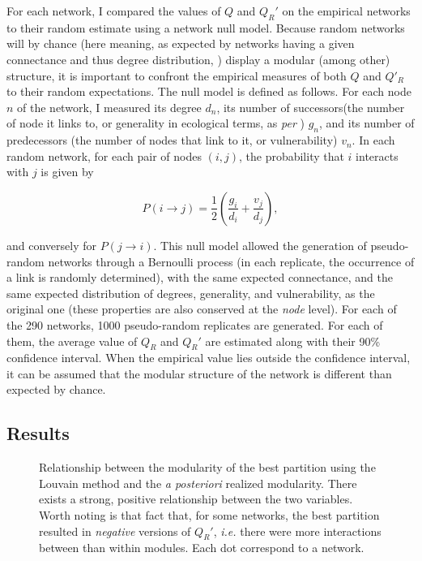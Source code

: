 \documentclass[12pt,oneside]{article}
\begin{document}
For each network, I compared the values of $Q$ and $Q_R'$ on the empirical
networks to their random estimate using a network null model. Because random
networks will by chance (here meaning, as expected by networks having a
given connectance and thus degree distribution, \textcite{poisot_when_2013})
display a modular (among other) structure, it is important to confront the
empirical measures of both $Q$ and $Q'_R$ to their random expectations. The
null model is defined as follows. For each node $n$ of the network, I measured
its degree $d_n$, its number of successors(the number of node it links to,
or generality in ecological terms, as \emph{per} \cite{schoener_food_1989})
$g_n$, and its number of predecessors (the number of nodes that link to it,
or vulnerability) $v_n$. In each random network, for each pair of nodes
$(i,j)$, the probability that $i$ interacts with $j$ is given by

\begin{equation}
P(i\rightarrow j) = \frac{1}{2}\left(\frac{g_i}{d_i}+\frac{v_j}{d_j}\right),
\label{e:null}
\end{equation}

\noindent and conversely for $P(j \rightarrow i)$. This null model allowed
the generation of pseudo-random networks through a Bernoulli process (in
each replicate, the occurrence of a link is randomly determined), with the
same expected connectance, and the same expected distribution of degrees,
generality, and vulnerability, as the original one (these properties are
also conserved at the \emph{node} level).  For each of the 290 networks,
1000 pseudo-random replicates are generated. For each of them, the average
value of $Q_R$ and $Q_R'$ are estimated along with their 90\% confidence
interval. When the empirical value lies outside the confidence interval,
it can be assumed that the modular structure of the network is different
than expected by chance.

\subsection{Results}

\begin{figure}[tbp]
\begin{center}
\end{center}
\caption{Relationship between the modularity of the best partition using the Louvain method and the \emph{a posteriori} realized modularity. There exists a strong, positive relationship between the two variables. Worth noting is that fact that, for some networks, the best partition resulted in \emph{negative} versions of $Q_R'$, \emph{i.e.} there were more interactions between than within modules. Each dot correspond to a network.}
\label{f:qqr}
\end{figure}
\end{document}
